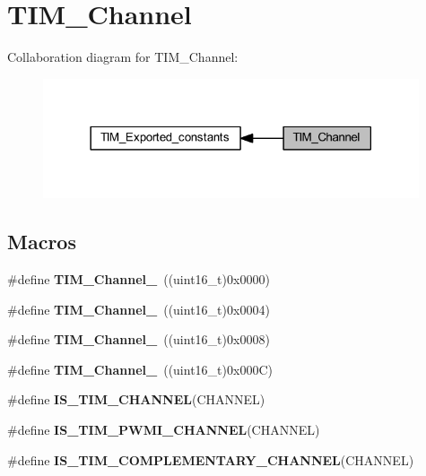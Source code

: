 \hypertarget{group___t_i_m___channel}{}\section{T\+I\+M\+\_\+\+Channel}
\label{group___t_i_m___channel}
Collaboration diagram for T\+I\+M\+\_\+\+Channel\+:
\nopagebreak
\begin{figure}[H]
\begin{center}
\leavevmode
\includegraphics[width=314pt]{group___t_i_m___channel}
\end{center}
\end{figure}
\subsection*{Macros}
\begin{DoxyCompactItemize}
\item 
\mbox{\label{group___t_i_m___channel_ga69ea7f558f02c63dd1082d784d2449bd}} 
\#define {\bfseries T\+I\+M\+\_\+\+Channel\+\_}~((uint16\+\_\+t)0x0000)
\item 
\mbox{\label{group___t_i_m___channel_ga03d7da8269a87a560f68985b4bd80931}} 
\#define {\bfseries T\+I\+M\+\_\+\+Channel\+\_}~((uint16\+\_\+t)0x0004)
\item 
\mbox{\label{group___t_i_m___channel_ga012711b19e8c91f6f352801a3dc0bcc9}} 
\#define {\bfseries T\+I\+M\+\_\+\+Channel\+\_}~((uint16\+\_\+t)0x0008)
\item 
\mbox{\label{group___t_i_m___channel_ga7414888c40d066af235bc1f80b99bd9d}} 
\#define {\bfseries T\+I\+M\+\_\+\+Channel\+\_}~((uint16\+\_\+t)0x000\+C)
\item 
\#define {\bfseries I\+S\+\_\+\+T\+I\+M\+\_\+\+C\+H\+A\+N\+N\+EL}(C\+H\+A\+N\+N\+EL)
\item 
\#define {\bfseries I\+S\+\_\+\+T\+I\+M\+\_\+\+P\+W\+M\+I\+\_\+\+C\+H\+A\+N\+N\+EL}(C\+H\+A\+N\+N\+EL)
\item 
\#define {\bfseries I\+S\+\_\+\+T\+I\+M\+\_\+\+C\+O\+M\+P\+L\+E\+M\+E\+N\+T\+A\+R\+Y\+\_\+\+C\+H\+A\+N\+N\+EL}(C\+H\+A\+N\+N\+EL)
\end{DoxyCompactItemize}


